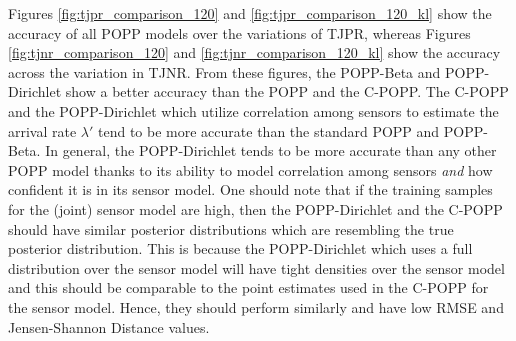Figures \ref{fig:tjpr_comparison_120} and \ref{fig:tjpr_comparison_120_kl} show the accuracy of all POPP models over the variations of TJPR, whereas Figures \ref{fig:tjnr_comparison_120} and \ref{fig:tjnr_comparison_120_kl} show the accuracy across the variation in TJNR. From these figures, the POPP-Beta and POPP-Dirichlet show a better accuracy than the POPP and the C-POPP. The C-POPP and the POPP-Dirichlet which utilize correlation among sensors to estimate the arrival rate $\lambda'$ tend to be more accurate than the standard POPP and POPP-Beta.
In general, the POPP-Dirichlet tends to be more accurate than any other POPP model thanks to its ability to model correlation among sensors \emph{and} how confident it is in its sensor model.
One should note that if the training samples for the (joint) sensor model are high, then the POPP-Dirichlet and the C-POPP should have similar posterior distributions which are resembling the true posterior distribution. This is because the POPP-Dirichlet which uses a full distribution over the sensor model will have tight densities over the sensor model and this should be comparable to the point estimates used in the C-POPP for the sensor model. Hence, they should perform similarly and have low RMSE and Jensen-Shannon Distance values.
